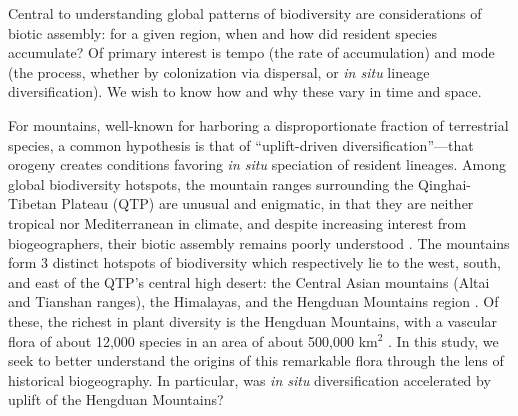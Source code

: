 

Central to understanding global patterns of biodiversity are
considerations of biotic assembly: for a given region, when and how
did resident species accumulate? Of primary interest is tempo (the
rate of accumulation) and mode (the process, whether by colonization
via dispersal, or \textit{in situ} lineage diversification). We wish
to know how and why these vary in time and space.

For mountains, well-known for harboring a disproportionate fraction of
terrestrial species, a common hypothesis is that of ``uplift-driven
diversification''---that orogeny creates conditions favoring
\textit{in situ} speciation of resident lineages. Among global
biodiversity hotspots, the mountain ranges surrounding the
Qinghai-Tibetan Plateau (QTP) are unusual and enigmatic, in that they
are neither tropical nor Mediterranean in climate, and despite
increasing interest from biogeographers, their biotic assembly remains
poorly understood \citep{Favre2015,Wen2014,Hughes2015}. The mountains
form 3 distinct hotspots of biodiversity which respectively lie to the
west, south, and east of the QTP's central high desert: the Central
Asian mountains (Altai and Tianshan ranges), the Himalayas, and the
Hengduan Mountains region \citep{Favre2015}. Of these, the richest in
plant diversity is the Hengduan Mountains, with a vascular flora of
about 12,000 species in an area of about 500,000 km$^2$
\citep{Boufford2014,LiEtLi1993,Wu1988}. In this study, we seek to
better understand the origins of this remarkable flora through the
lens of historical biogeography. In particular, was \textit{in situ}
diversification accelerated by uplift of the Hengduan Mountains?


